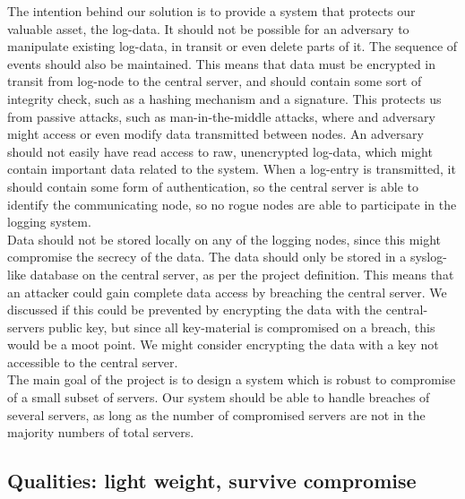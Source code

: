 The intention behind our solution is to provide a system that protects our valuable asset, the log-data. It should not be possible for an adversary to manipulate existing log-data, in transit or even delete parts of it. The sequence of events should also be maintained. This means that data must be encrypted in transit from log-node to the central server, and should contain some sort of integrity check, such as a hashing mechanism and a signature. This protects us from passive attacks, such as man-in-the-middle attacks, where and adversary might access or even modify data transmitted between nodes.
An adversary should not easily have read access to raw, unencrypted log-data, which might contain important data related to the system. When a log-entry is transmitted, it should contain some form of authentication, so the central server is able to identify the communicating node, so no rogue nodes are able to participate in the logging system.
\\Data should not be stored locally on any of the logging nodes, since this might compromise the secrecy of the data. The data should only be stored in a syslog-like database on the central server, as per the project definition. This means that an attacker could gain complete data access by breaching the central server. We discussed if this could be prevented by encrypting the data with the central-servers public key, but since all key-material is compromised on a breach, this would be a moot point. We might consider encrypting the data with a key not accessible to the central server.
\\The main goal of the project is to design a system which is robust to compromise of a small subset of servers. Our system should be able to handle breaches of several servers, as long as the number of compromised servers are not in the majority numbers of total servers.

\subsection{Qualities: light weight, survive compromise}
